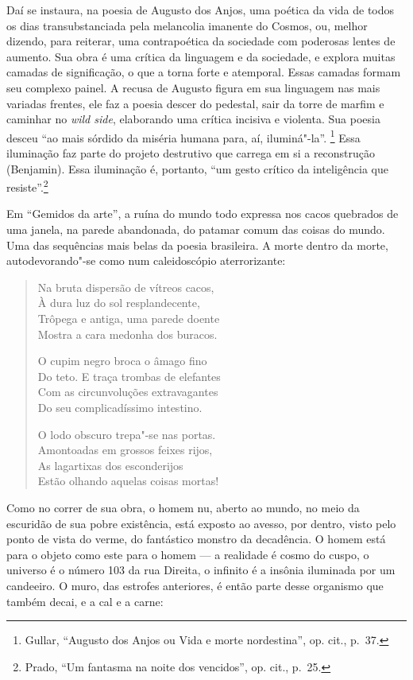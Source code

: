 Daí se instaura, na poesia de Augusto dos Anjos, uma poética da vida
de todos os dias transubstanciada pela melancolia imanente do Cosmos,
ou, melhor dizendo, para reiterar, uma contrapoética da sociedade com
poderosas lentes de aumento. Sua obra é uma crítica da linguagem e da
sociedade, e explora muitas camadas de significação, o que a torna
forte e atemporal. Essas camadas formam seu complexo painel. A
recusa de Augusto figura em sua linguagem nas mais variadas frentes,
ele faz a poesia descer do pedestal, sair da torre de marfim e caminhar
no \textit{wild side}, elaborando uma crítica incisiva e violenta. Sua
poesia desceu “ao mais sórdido da miséria humana para, aí, iluminá"-la”.
\footnote{Gullar, “Augusto dos Anjos ou Vida e morte
nordestina”, op. cit., p.~37.} Essa iluminação faz parte do projeto destrutivo que
carrega em si a reconstrução (Benjamin). Essa iluminação é, portanto,
“um gesto crítico da inteligência que resiste”.\footnote{Prado, “Um fantasma 
na noite dos vencidos”, op. cit., p.~25.}

Em “Gemidos da arte”, a ruína do mundo todo expressa nos cacos
quebrados de uma janela, na parede abandonada, do patamar comum das
coisas do mundo. Uma das sequências mais belas da poesia brasileira. A
morte dentro da morte, autodevorando"-se como num caleidoscópio
aterrorizante: 

\begin{verse}
Na bruta dispersão de vítreos cacos,\\
À dura luz do sol resplandecente,\\
Trôpega e antiga, uma parede doente\\
Mostra a cara medonha dos buracos.

O cupim negro broca o âmago fino\\
Do teto. E traça trombas de elefantes\\
Com as circunvoluções extravagantes\\
Do seu complicadíssimo intestino. 

O lodo obscuro trepa"-se nas portas.\\
Amontoadas em grossos feixes rijos,\\\pagebreak
As lagartixas dos esconderijos\\
Estão olhando aquelas coisas mortas!
\end{verse}

Como no correr de sua obra, o homem nu, aberto ao mundo, no meio da
escuridão de sua pobre existência, está exposto ao avesso, por dentro,
visto pelo ponto de vista do verme, do fantástico monstro da
decadência. O homem está para o objeto como este para o homem --- a
realidade é cosmo do cuspo, o universo é o número 103 da rua Direita, o
infinito é a insônia iluminada por um candeeiro. O muro, das estrofes
anteriores, é então parte desse organismo que também decai, e a cal e a
carne:

